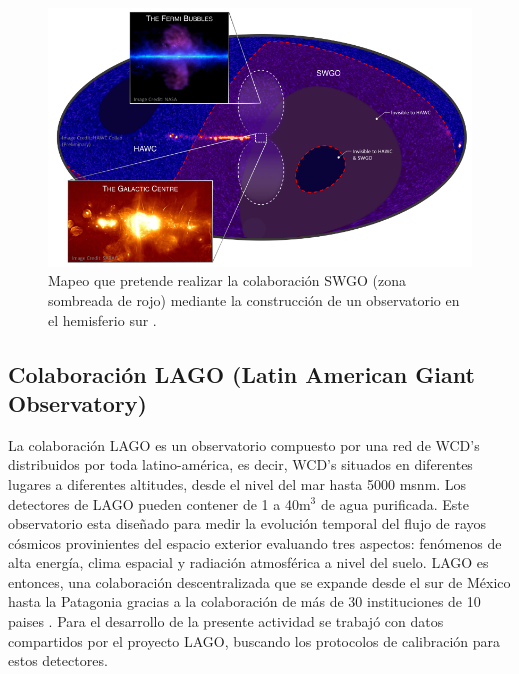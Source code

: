 	\begin{figure}[h]
		\centering
		\includegraphics[scale = 0.45]{FIGURAS/MAPEO_SWGO.png}
		\caption{Mapeo que pretende realizar la colaboración SWGO (zona sombreada de rojo) mediante la construcción de un observatorio en el hemisferio sur \cite{schoorlemmer2019nextgeneration}.}
		\label{MAPEO_SWGO}
	\end{figure}
	
	\subsection{Colaboración LAGO (Latin American Giant Observatory)}\label{LAGO}
	La colaboración LAGO es un observatorio compuesto por una red de WCD's distribuidos por toda latino-américa, es decir, WCD's situados en diferentes lugares a diferentes altitudes, desde el nivel del mar hasta 5000 msnm. Los detectores de LAGO pueden contener de 1 a 40m$^3$ de agua purificada. Este observatorio esta diseñado para medir la evolución temporal del flujo de rayos cósmicos provinientes del espacio exterior evaluando tres aspectos: fenómenos de alta energía, clima espacial y radiación atmosférica a nivel del suelo. LAGO es entonces, una colaboración descentralizada que se expande desde el sur de México hasta la Patagonia gracias a la colaboración de más de 30 instituciones de 10 paises \cite{SIDELNIK2017173}. Para el desarrollo de la presente actividad se trabajó con datos compartidos por el proyecto LAGO, buscando los protocolos de calibración para estos detectores.
	
	
